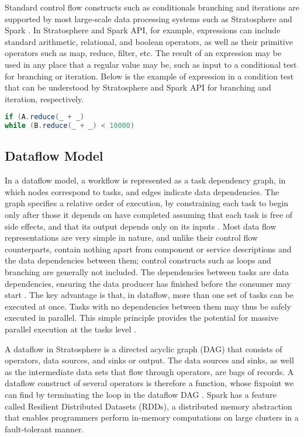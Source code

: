 Standard control flow constructs such as conditionals branching and iterations are supported by most large-scale data processing systems such as Stratosphere \cite{alexandrov2011mapreduce} and Spark \cite{zaharia2010spark}. In Stratosphere and Spark API, for example, expressions can include standard arithmetic, relational, and boolean operators, as well as their primitive operators such as map, reduce, filter, etc. The result of an expression may be used in any place that a regular value may be, such as input to a conditional test for branching or iteration. Below is the example of expression in a condition test that can be understood by Stratosphere and Spark API for branching and iteration, respectively.
\begin{lstlisting}[language=scala, label = controlflow]
if (A.reduce(_ + _)
while (B.reduce(_ + _) < 10000)
\end{lstlisting} 
\subsection{Dataflow Model}

In a dataflow model, a workflow is represented as a task dependency graph, in which nodes correspond to tasks, and edges indicate data dependencies. The graph specifies a relative order of execution, by constraining each task to begin only after those it depends on have completed assuming that each task is free of side effects, and that its output depends only on its inputs \cite{kelly2011applying}. Most data flow representations are very simple in nature, and unlike their control flow counterparts, contain nothing apart from component or service descriptions and the data dependencies between them; control constructs such as loops and branching are generally not included. The dependencies between tasks are data dependencies, ensuring the data producer has finished before the consumer may start \cite{deelman2009workflows}. The key advantage is that, in dataflow, more than one set of tasks can be executed at once. Tasks with no dependencies between them may thus be safely executed in parallel. This simple principle provides the potential for massive parallel execution at the tasks level \cite{johnston2004advances}.

A dataflow in Stratosphere is a directed acyclic graph (DAG) that consists of operators, data sources, and sinks or output. The data sources and sinks, as well as the intermediate data sets that flow through operators, are bags of records. A dataflow construct of several operators is therefore a function, whose fixpoint we can find by terminating the loop in the dataflow DAG \cite{ewen2012spinning}. Spark has a feature called Resilient Distributed Datasets (RDDs), a distributed memory abstraction that enables programmers perform in-memory computations on large clusters in a fault-tolerant manner\cite{zaharia2012resilient}.

